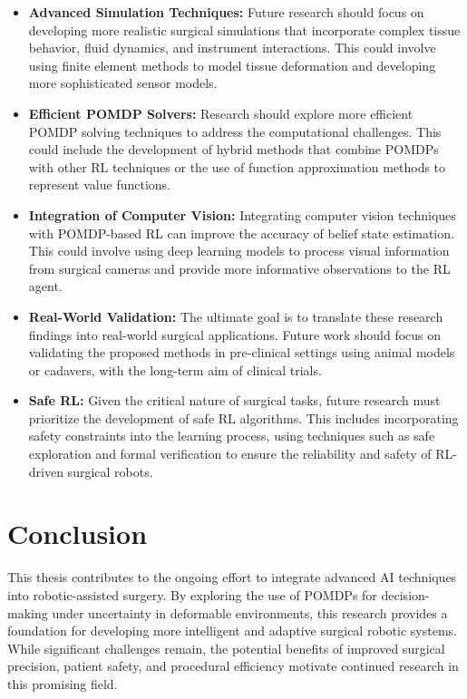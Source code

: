 \begin{itemize}
    \item \textbf{Advanced Simulation Techniques:} Future research should focus on developing more realistic surgical simulations that incorporate complex tissue behavior, fluid dynamics, and instrument interactions. This could involve using finite element methods to model tissue deformation and developing more sophisticated sensor models.
    \item \textbf{Efficient POMDP Solvers:} Research should explore more efficient POMDP solving techniques to address the computational challenges. This could include the development of hybrid methods that combine POMDPs with other RL techniques or the use of function approximation methods to represent value functions.
    \item \textbf{Integration of Computer Vision:} Integrating computer vision techniques with POMDP-based RL can improve the accuracy of belief state estimation. This could involve using deep learning models to process visual information from surgical cameras and provide more informative observations to the RL agent.
    \item \textbf{Real-World Validation:} The ultimate goal is to translate these research findings into real-world surgical applications. Future work should focus on validating the proposed methods in pre-clinical settings using animal models or cadavers, with the long-term aim of clinical trials.
    \item \textbf{Safe RL:} Given the critical nature of surgical tasks, future research must prioritize the development of safe RL algorithms. This includes incorporating safety constraints into the learning process, using techniques such as safe exploration and formal verification to ensure the reliability and safety of RL-driven surgical robots.
\end{itemize}

\section{Conclusion}

This thesis contributes to the ongoing effort to integrate advanced AI techniques into robotic-assisted surgery. By exploring the use of POMDPs for decision-making under uncertainty in deformable environments, this research provides a foundation for developing more intelligent and adaptive surgical robotic systems. While significant challenges remain, the potential benefits of improved surgical precision, patient safety, and procedural efficiency motivate continued research in this promising field.